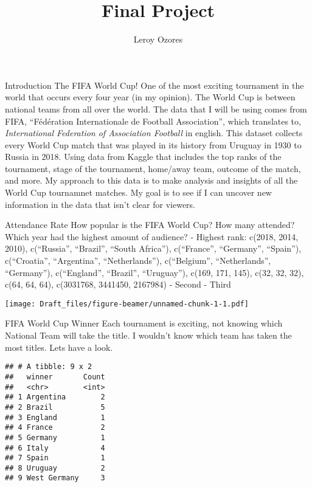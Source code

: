 \documentclass[
  ignorenonframetext,
]{beamer}
\title{Final Project}
\author{Leroy Ozores}
\date{}
\begin{document}
\frame{\titlepage}

\begin{frame}{Introduction The FIFA World Cup! One of the most exciting
tournament in the world that occurs every four year (in my opinion). The
World Cup is between national teams from all over the world.}
\label{introduction-the-fifa-world-cup-one-of-the-most-exciting-tournament-in-the-world-that-occurs-every-four-year-in-my-opinion.-the-world-cup-is-between-national-teams-from-all-over-the-world.}
The data that I will be using comes from FIFA, ``Fédération
Internationale de Football Association'', which translates to,
\emph{International Federation of Association Football} in english. This
dataset collects every World Cup match that was played in its history
from Uruguay in 1930 to Russia in 2018. Using data from Kaggle that
includes the top ranks of the tournament, stage of the tournament,
home/away team, outcome of the match, and more. My approach to this data
is to make analysis and insights of all the World Cup tournamnet
matches. My goal is to see if I can uncover new information in the data
that isn't clear for viewers.
\end{frame}

\begin{frame}{Attendance Rate}
\label{attendance-rate}
How popular is the FIFA World Cup? How many attended? Which year had the
highest amount of audience? - Highest rank: c(2018, 2014, 2010),
c(``Russia'', ``Brazil'', ``South Africa''), c(``France'', ``Germany'',
``Spain''), c(``Croatia'', ``Argentina'', ``Netherlands''),
c(``Belgium'', ``Netherlands'', ``Germany''), c(``England'', ``Brazil'',
``Uruguay''), c(169, 171, 145), c(32, 32, 32), c(64, 64, 64), c(3031768,
3441450, 2167984) - Second - Third

\texttt{[image: Draft\_files/figure-beamer/unnamed-chunk-1-1.pdf]}
\end{frame}

\begin{frame}[fragile]{FIFA World Cup Winner}
\label{fifa-world-cup-winner}
Each tournament is exciting, not knowing which National Team will take
the title. I wouldn't know which team has taken the most titles. Lets
have a look.

\begin{verbatim}
## # A tibble: 9 x 2
##   winner       Count
##   <chr>        <int>
## 1 Argentina        2
## 2 Brazil           5
## 3 England          1
## 4 France           2
## 5 Germany          1
## 6 Italy            4
## 7 Spain            1
## 8 Uruguay          2
## 9 West Germany     3
\end{verbatim}
\end{frame}
\end{document}
